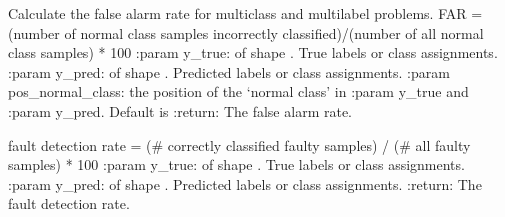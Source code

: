 \documentclass[letterpaper,10pt,english]{sphinxmanual}
\begin{document}
\begin{fulllineitems}
\label{\detokenize{pusion.evaluation.evaluation_metrics:pusion.evaluation.evaluation_metrics.far}}
\sphinxAtStartPar
Calculate the false alarm rate for multiclass and multi\sphinxhyphen{}label problems.
FAR = (number of normal class samples incorrectly classified)/(number of all normal class samples) * 100
:param y\_true:  of shape . True labels or class assignments.
:param y\_pred:  of shape . Predicted labels or class assignments.
:param pos\_normal\_class: the position of the ‘normal class’ in :param y\_true and :param y\_pred. Default is 
:return: The false alarm rate.

\end{fulllineitems}


\begin{fulllineitems}
\label{\detokenize{pusion.evaluation.evaluation_metrics:pusion.evaluation.evaluation_metrics.multiclass_fdr}}
\sphinxAtStartPar
fault detection rate = (\# correctly classified faulty samples) / (\# all faulty samples) * 100
:param y\_true:  of shape . True labels or class assignments.
:param y\_pred:  of shape . Predicted labels or class assignments.
:return: The fault detection rate.

\end{fulllineitems}

\end{document}
